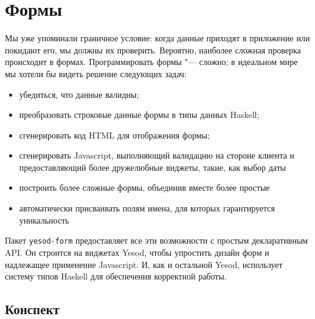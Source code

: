 \section{Формы}

Мы уже упоминали граничное условие: когда данные приходят в приложение или покидают его, мы должны их проверить. Вероятно, наиболее сложная проверка происходит в формах. Программировать формы "--- сложно; в идеальном мире мы хотели бы видеть решение следующих задач:

\begin{itemize}
\item убедиться, что данные валидны; %
\item преобразовать строковые данные формы в типы данных Haskell; %
\item сгенерировать код HTML для отображения формы;
\item сгенерировать Javascript, выполняющий валидацию на стороне клиента и предоставляющий более дружелюбные виджеты, такие, как выбор даты
\item построить более сложные формы, объединив вместе более простые
\item автоматически присваивать полям имена, для которых гарантируется уникальность
\end{itemize}

Пакет \lstinline'yesod-form' предоставляет все эти возможности с простым декларативным API. Он строится на виджетах Yesod, чтобы упростить дизайн форм и надлежащее применение Javascript. И, как и остальной Yesod, использует систему типов Haskell для обеспечения корректной работы.

\subsection{Конспект}

